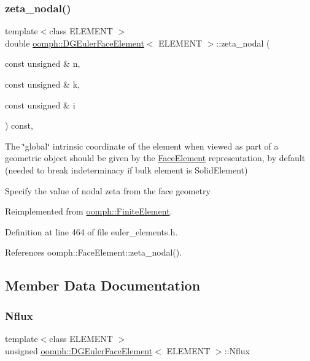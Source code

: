 \subsubsection{\texorpdfstring{zeta\+\_\+nodal()}{zeta\_nodal()}}
{\footnotesize\ttfamily template$<$class E\+L\+E\+M\+E\+NT $>$ \\
double \hyperlink{classoomph_1_1DGEulerFaceElement}{oomph\+::\+D\+G\+Euler\+Face\+Element}$<$ E\+L\+E\+M\+E\+NT $>$\+::zeta\+\_\+nodal (\begin{DoxyParamCaption}\item[{const unsigned \&}]{n,  }\item[{const unsigned \&}]{k,  }\item[{const unsigned \&}]{i }\end{DoxyParamCaption}) const\hspace{0.3cm}{\ttfamily [inline]}, {\ttfamily [virtual]}}



The \char`\"{}global\char`\"{} intrinsic coordinate of the element when viewed as part of a geometric object should be given by the \hyperlink{classoomph_1_1FaceElement}{Face\+Element} representation, by default (needed to break indeterminacy if bulk element is Solid\+Element) 

Specify the value of nodal zeta from the face geometry 

Reimplemented from \hyperlink{classoomph_1_1FiniteElement_a849561c5fbcbc07dc49d2dc6cca68559}{oomph\+::\+Finite\+Element}.



Definition at line 464 of file euler\+\_\+elements.\+h.



References oomph\+::\+Face\+Element\+::zeta\+\_\+nodal().



\subsection{Member Data Documentation}
\mbox{\label{classoomph_1_1DGEulerFaceElement_ab2c9036ce56daafed333108febfa2f7b}} 
\subsubsection{\texorpdfstring{Nflux}{Nflux}}
{\footnotesize\ttfamily template$<$class E\+L\+E\+M\+E\+NT $>$ \\
unsigned \hyperlink{classoomph_1_1DGEulerFaceElement}{oomph\+::\+D\+G\+Euler\+Face\+Element}$<$ E\+L\+E\+M\+E\+NT $>$\+::Nflux\hspace{0.3cm}{\ttfamily [private]}}



